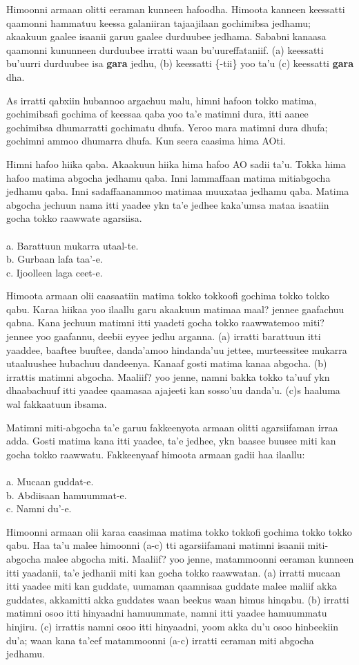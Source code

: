 \documentclass[11pt,b5paper]{book}
\begin{document}
Himoonni armaan olitti eeraman kunneen hafoodha. Himoota kanneen keessatti qaamonni hammatuu keessa galaniiran tajaajilaan gochimibsa jedhamu; akaakuun gaalee isaanii garuu gaalee durduubee jedhama. Sababni kanaasa qaamonni kununneen durduubee irratti waan bu’uureffataniif. (a) keessatti bu’uurri durduubee isa \textbf{gara} jedhu, (b) keessatti \{-tii\} yoo ta’u (c) keessatti \textbf{gara} dha.

As irratti qabxiin hubannoo argachuu malu, himni hafoon tokko matima, gochimibsafi gochima of keessaa qaba yoo ta’e matimni dura, itti aanee gochimibsa dhumarratti gochimatu dhufa. Yeroo mara matimni dura dhufa; gochimni ammoo dhumarra dhufa. Kun seera caasima hima AOti.

Himni hafoo hiika qaba. Akaakuun hiika hima hafoo AO sadii ta’u. Tokka hima hafoo
matima abgocha jedhamu qaba. Inni lammaffaan matima mitiabgocha jedhamu qaba. Inni sadaffaanammoo matimaa muuxataa jedhamu qaba. Matima abgocha jechuun nama itti yaadee ykn ta’e jedhee kaka’umsa mataa isaatiin gocha tokko raawwate agarsiisa. \\
\\
a. Barattuun mukarra utaal-te.\\
b. Gurbaan lafa taa’-e.\\
c. Ijoolleen laga ceet-e.

Himoota armaan olii caasaatiin matima tokko tokkoofi gochima tokko tokko qabu. Karaa hiikaa yoo ilaallu garu akaakuun matimaa maal? jennee gaafachuu qabna. Kana jechuun matimni itti yaadeti gocha tokko raawwatemoo miti? jennee yoo gaafannu, deebii eyyee jedhu arganna. (a) irratti barattuun itti
yaaddee, baaftee buuftee, danda’amoo hindanda’uu jettee, murteessitee mukarra utaaluushee hubachuu dandeenya. Kanaaf gosti matima kanaa abgocha. (b) irrattis matimni abgocha. Maaliif? yoo jenne, namni bakka tokko ta’uuf ykn dhaabachuuf itti yaadee qaamasaa ajajeeti kan sosso’uu danda’u. (c)s haaluma wal fakkaatuun ibsama.

Matimni miti-abgocha ta’e garuu fakkeenyota armaan olitti agarsiifaman irraa adda. Gosti matima kana itti yaadee, ta’e jedhee, ykn baasee buusee miti kan gocha tokko raawwatu. Fakkeenyaaf himoota armaan gadii haa ilaallu:\\
\\
a. Mucaan guddat-e.\\
b. Abdiisaan hamuummat-e.\\
c. Namni du’-e.

Himoonni armaan olii karaa caasimaa matima tokko tokkofi gochima tokko tokko qabu. Haa ta’u malee himoonni (a-c) tti agarsiifamani matimni isaanii miti-abgocha malee abgocha miti. Maaliif? yoo jenne, matammoonni eeraman kunneen itti yaadanii, ta’e jedhanii miti kan gocha tokko raawwatan. (a) irratti mucaan itti yaadee miti kan guddate, uumaman qaamnisaa guddate malee maliif akka guddates, akkamitti akka guddates waan beekus waan himus hinqabu. (b) irratti matimni osoo itti hinyaadni hamuummate, namni itti yaadee hamuummatu hinjiru. (c) irrattis namni osoo itti hinyaadni, yoom akka
du’u osoo hinbeekiin du’a; waan kana ta’eef matammoonni (a-c) irratti eeraman miti abgocha jedhamu.
\end{document}
